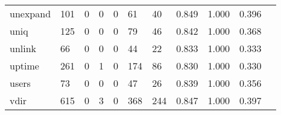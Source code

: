 \begin{longtable}{lp{1.2cm}p{1.2cm}p{1.2cm}p{1.2cm}p{1.2cm}p{1.2cm}p{1.2cm}p{1.2cm}p{1.2cm}p{1.2cm}}
unexpand  &                                   101 &                                                  0 &                                                  0 &                                                  0 &                                                 61 &                                                 40 &                                              0.849 &                                              1.000 &                                              0.396 \\
uniq      &                                   125 &                                                  0 &                                                  0 &                                                  0 &                                                 79 &                                                 46 &                                              0.842 &                                              1.000 &                                              0.368 \\
unlink    &                                    66 &                                                  0 &                                                  0 &                                                  0 &                                                 44 &                                                 22 &                                              0.833 &                                              1.000 &                                              0.333 \\
uptime    &                                   261 &                                                  0 &                                                  1 &                                                  0 &                                                174 &                                                 86 &                                              0.830 &                                              1.000 &                                              0.330 \\
users     &                                    73 &                                                  0 &                                                  0 &                                                  0 &                                                 47 &                                                 26 &                                              0.839 &                                              1.000 &                                              0.356 \\
vdir      &                                   615 &                                                  0 &                                                  3 &                                                  0 &                                                368 &                                                244 &                                              0.847 &                                              1.000 &                                              0.397 \\

\end{longtable}
